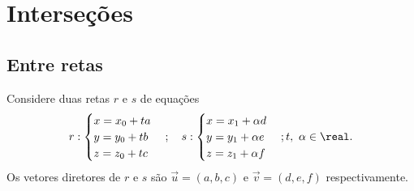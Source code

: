 \section{Interseções} %
\label{sec:intersecoes}
\subsection{Entre retas} %
\label{sub:entre_retas}
Considere duas retas $r$ e $s$ de equações
\[
    r: \begin{cases}
        x = x_0 + ta\\
        y = y_0 + tb\\
        z = z_0 + tc
    \end{cases}; \quad s: \begin{cases}
        x = x_1 + \alpha d\\
        y = y_1 + \alpha e\\
        z = z_1 + \alpha f
    \end{cases}; t,\ \alpha \in \real.
\]
Os vetores diretores de $r$ e $s$ são $\vec{u} = (a,b,c)$ e $\vec{v} = (d,e,f)$ respectivamente.
